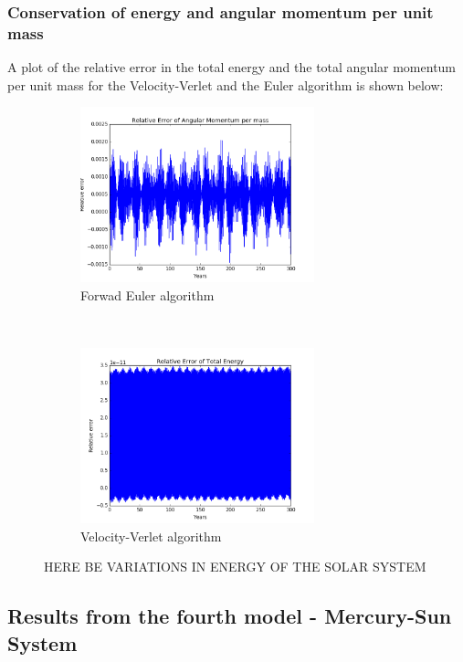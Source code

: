 \documentclass[a4paper, 10pt]{article}
\begin{document}
\subsubsection{Conservation of energy and angular momentum per unit mass}
A plot of the relative error in the total energy and the total angular momentum per unit mass for the Velocity-Verlet and the Euler algorithm is shown below:
\begin{figure}[t!]
    \centering
    \begin{subfigure}[t]{0.5\textwidth}
        \centering
        \includegraphics[height=2.0in]{relErrMomFull.png}
        \caption{Forwad Euler algorithm}
    \end{subfigure}%
    ~ 
    \begin{subfigure}[t]{0.5\textwidth}
        \centering
        \includegraphics[height=2.0in]{relErrEnFull.png}
        \caption{Velocity-Verlet algorithm}
    \end{subfigure}
    \caption{HERE BE VARIATIONS IN ENERGY OF THE SOLAR SYSTEM}
\end{figure}

\subsection{Results from the fourth model - Mercury-Sun System}
\end{document}
